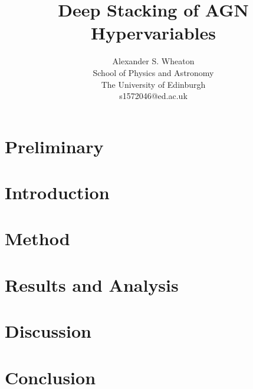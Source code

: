 \documentclass[a4paper,11pt]{article}
\title{Deep Stacking of AGN Hypervariables}
\author{
    Alexander S. Wheaton\\
    School of Physics and Astronomy\\
    The University of Edinburgh\\
    s1572046@ed.ac.uk\break
}
\begin{document}
\maketitle

\begin{abstract}
\end{abstract}

\section{Preliminary}
\section{Introduction}
\section{Method}
\section{Results and Analysis}
\section{Discussion}
\section{Conclusion}

\printbibliography
\end{document}
